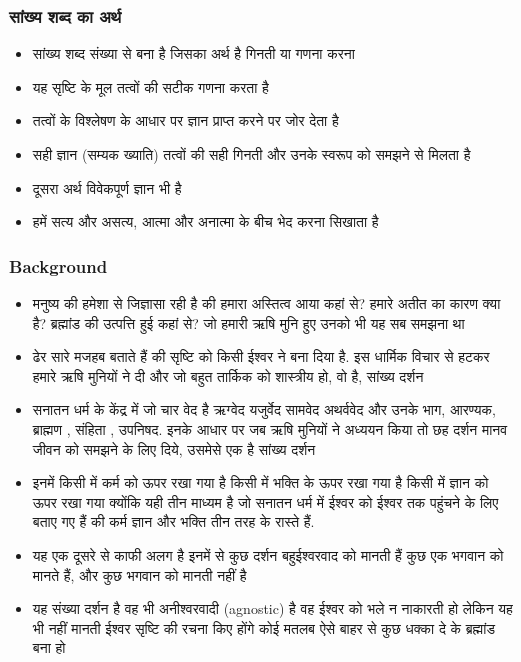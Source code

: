 \begin{frame}[fragile]\frametitle{सांख्य शब्द का अर्थ}
      \begin{itemize}
	\item सांख्य शब्द संख्या से बना है जिसका अर्थ है गिनती या गणना करना
	\item यह सृष्टि के मूल तत्वों की सटीक गणना करता है
	\item तत्वों के विश्लेषण के आधार पर ज्ञान प्राप्त करने पर जोर देता है
	\item सही ज्ञान (सम्यक ख्याति) तत्वों की सही गिनती और उनके स्वरूप को समझने से मिलता है
	\item दूसरा अर्थ विवेकपूर्ण ज्ञान भी है
	\item हमें सत्य और असत्य, आत्मा और अनात्मा के बीच भेद करना सिखाता है
	  \end{itemize}
\end{frame}

\begin{frame}[fragile]\frametitle{Background}

      \begin{itemize}
        \item मनुष्य की हमेशा से जिज्ञासा रही है की हमारा अस्तित्व आया कहां से? हमारे अतीत का कारण क्या है? ब्रह्मांड की उत्पत्ति हुई कहां से? जो हमारी ऋषि मुनि हुए उनको भी यह सब समझना था 
		\item  ढेर सारे मजहब बताते हैं की सृष्टि को किसी ईश्वर ने बना दिया है. इस धार्मिक विचार से हटकर हमारे ऋषि मुनियों ने दी  और जो बहुत तार्किक को शास्त्रीय हो, वो है, सांख्य दर्शन 
		\item सनातन धर्म के केंद्र में जो चार वेद है ऋग्वेद यजुर्वेद सामवेद अथर्ववेद और उनके भाग, आरण्यक, ब्राह्मण , संहिता ,  उपनिषद.  इनके आधार पर जब ऋषि मुनियों ने अध्ययन किया तो छह दर्शन मानव जीवन को समझने के लिए दिये, उसमेसे एक है सांख्य दर्शन 
		\item इनमें किसी में कर्म को ऊपर रखा गया है किसी में भक्ति के ऊपर रखा गया है किसी में ज्ञान को ऊपर रखा गया क्योंकि यही तीन
माध्यम है जो सनातन धर्म में ईश्वर को ईश्वर तक पहुंचने के लिए बताए गए हैं की कर्म ज्ञान और भक्ति तीन तरह के रास्ते हैं.
		\item यह एक दूसरे से काफी अलग है इनमें से कुछ दर्शन बहुईश्वरवाद को मानती हैं कुछ एक भगवान को मानते हैं, और कुछ
भगवान को मानती नहीं है 
\item यह संख्या दर्शन है वह भी अनीश्वरवादी  (agnostic) है वह ईश्वर को भले  न नाकारती हो लेकिन यह भी नहीं मानती ईश्वर सृष्टि की रचना किए होंगे कोई मतलब ऐसे बाहर से कुछ धक्का  दे के  ब्रह्मांड बना हो
      \end{itemize}
\end{frame}



